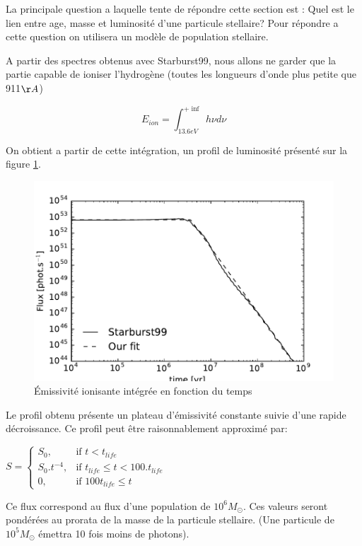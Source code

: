 La principale question a laquelle tente de répondre cette section est : Quel est le lien entre age, masse et luminosité d'une particule stellaire?
Pour répondre a cette question on utilisera un modèle de population stellaire.

A partir des spectres obtenus avec Starburst99, nous allons ne garder que la partie capable de ioniser l'hydrogène (toutes les longueurs d'onde plus petite que 911$\AA$) 

\begin{equation}
E_{ion} = \int_{13.6eV}^{+\inf} h \nu d\nu
\end{equation}

On obtient a partir de cette intégration, un profil de luminosité présenté sur la figure \ref{fig:flux}.

\begin{figure}[htbp]
        \includegraphics[width=.95\linewidth]{img/03/flux.pdf} 
        \caption{Émissivité ionisante intégrée en fonction du temps}
 		\label{fig:flux}
\end{figure}

Le profil obtenu présente un plateau d'émissivité constante suivie d'une rapide décroissance.
Ce profil peut être raisonnablement approximé par:

$
    S = 
\begin{cases}
    S_0 ,         & \text{if } t < t_{life}\\
    S_0.t^{-4},   & \text{if } t_{life} \leq t < 100.t_{life} \\
    0,   & \text{if } 100t_{life} \leq t
\end{cases}
$

Ce flux correspond au flux d'une population de $10^6M_\odot$.
Ces valeurs seront pondérées au prorata de la masse de la particule stellaire. (Une particule de $10^5M_\odot$ émettra 10 fois moins de photons).

